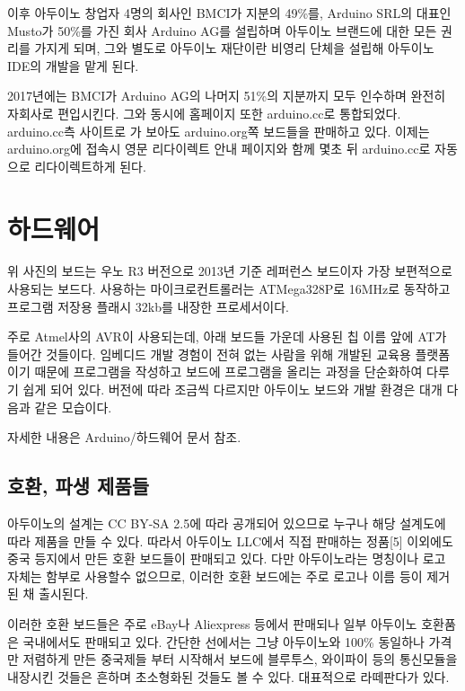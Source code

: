 \documentclass[12pt, a4paper, oneside]{book}
\let\stdsection\section
\renewcommand\section{\newpage\stdsection}
\begin{document}
이후 아두이노 창업자 4명의 회사인 BMCI가 지분의 49\%를, 
Arduino SRL의 대표인 Musto가 50\%를 가진 회사 Arduino AG를 설립하며 아두이노 브랜드에 대한 모든 권리를 가지게 되며, 
그와 별도로 아두이노 재단이란 비영리 단체을 설립해 아두이노 IDE의 개발을 맡게 된다.

2017년에는 BMCI가 Arduino AG의 나머지 51\%의 지분까지 모두 인수하며 완전히 자회사로 편입시킨다. 
그와 동시에 홈페이지 또한 arduino.cc로 통합되었다. 
arduino.cc측 사이트로 가 보아도 arduino.org쪽 보드들을 판매하고 있다. 
이제는 arduino.org에 접속시 영문 리다이렉트 안내 페이지와 함께 몇초 뒤 arduino.cc로 자동으로 리다이렉트하게 된다.


%
	\section{ 하드웨어}


위 사진의 보드는 우노 R3 버전으로 2013년 기준 레퍼런스 보드이자 가장 보편적으로 사용되는 보드다. 
사용하는 마이크로컨트롤러는 ATMega328P로 16MHz로 동작하고 프로그램 저장용 플래시 32kb를 내장한 프로세서이다.

주로 Atmel사의 AVR이 사용되는데, 아래 보드들 가운데 사용된 칩 이름 앞에 AT가 들어간 것들이다. 
임베디드 개발 경험이 전혀 없는 사람을 위해 개발된 교육용 플랫폼이기 때문에 프로그램을 작성하고 보드에 프로그램을 올리는 과정을 단순화하여 다루기 쉽게 되어 있다. 
버전에 따라 조금씩 다르지만 아두이노 보드와 개발 환경은 대개 다음과 같은 모습이다.

자세한 내용은 Arduino/하드웨어 문서 참조.

	\subsection{  호환, 파생 제품들}

아두이노의 설계는 CC BY-SA 2.5에 따라 공개되어 있으므로 누구나 해당 설계도에 따라 제품을 만들 수 있다. 
따라서 아두이노 LLC에서 직접 판매하는 정품[5] 이외에도 중국 등지에서 만든 호환 보드들이 판매되고 있다. 
다만 아두이노라는 명칭이나 로고 자체는 함부로 사용할수 없으므로, 이러한 호환 보드에는 주로 로고나 이름 등이 제거된 채 출시된다.

이러한 호환 보드들은 주로 eBay나 Aliexpress 등에서 판매되나 일부 아두이노 호환품은 국내에서도 판매되고 있다. 
간단한 선에서는 그냥 아두이노와 100\% 동일하나 가격만 저렴하게 만든 중국제들 부터 시작해서 보드에 블루투스, 와이파이 등의 통신모듈을 내장시킨 것들은 흔하며 초소형화된 것들도 볼 수 있다. 
대표적으로 라떼판다가 있다.
\end{document}
